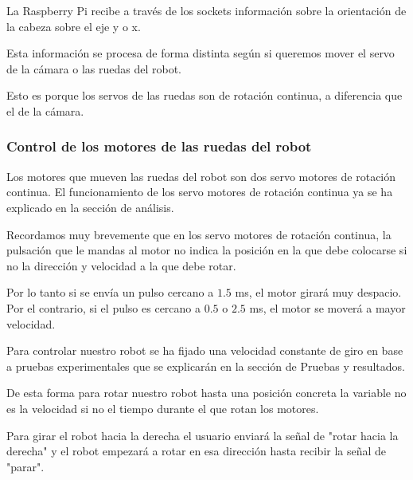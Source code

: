 \documentclass[twoside, 11pt]{epstfg}
\begin{document}
La Raspberry Pi recibe a través de los sockets información sobre la orientación de la cabeza sobre el eje y o x.


Esta información se procesa de forma distinta según si queremos mover el servo de la cámara o las ruedas del robot.

Esto es porque los servos de las ruedas son de rotación continua, a diferencia que el de la cámara.

\subsubsection{\textbf{Control de los motores de las ruedas del robot}}

Los motores que mueven las ruedas del robot son dos servo motores de rotación continua. El funcionamiento de los servo motores de rotación continua ya se ha explicado en la sección de análisis.

Recordamos muy brevemente que en los servo motores de rotación continua, la pulsación que le mandas al motor no indica la posición en la que debe colocarse si no la dirección y velocidad a la que debe rotar.

Por lo tanto si se envía un pulso cercano a $1.5$ ms, el motor girará muy despacio. Por el contrario, si el pulso es cercano a $0.5$ o $2.5$ ms, el motor se moverá a mayor velocidad.

Para controlar nuestro robot se ha fijado una velocidad constante de giro en base a pruebas experimentales que se explicarán en la sección de Pruebas y resultados.

De esta forma para rotar nuestro robot hasta una posición concreta la variable no es la velocidad si no el tiempo durante el que rotan los motores.

Para girar el robot hacia la derecha el usuario enviará la señal de "rotar hacia la derecha" y el robot empezará a rotar en esa dirección hasta recibir la señal de "parar".

%
%
%
\end{document}
